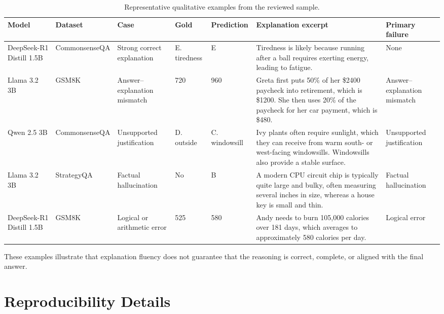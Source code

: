 \begin{table}[t]
\centering
\scriptsize
\caption{Representative qualitative examples from the reviewed sample.}
\label{tab:qualitative_examples}
\begin{tabular}{p{2.0cm}p{1.4cm}p{2.0cm}p{1.3cm}p{1.3cm}p{5.7cm}p{2.4cm}}
\toprule
\textbf{Model} &
\textbf{Dataset} &
\textbf{Case} &
\textbf{Gold} &
\textbf{Prediction} &
\textbf{Explanation excerpt} &
\textbf{Primary failure} \\
\midrule

DeepSeek-R1 Distill 1.5B &
CommonsenseQA &
Strong correct explanation &
E. tiredness &
E &
Tiredness is likely because running after a ball requires exerting energy,
leading to fatigue. &
None \\

Llama 3.2 3B &
GSM8K &
Answer--explanation mismatch &
720 &
960 &
Greta first puts 50\% of her \$2400 paycheck into retirement, which is
\$1200. She then uses 20\% of the paycheck for her car payment, which is
\$480. &
Answer--explanation mismatch \\

Qwen 2.5 3B &
CommonsenseQA &
Unsupported justification &
D. outside &
C. windowsill &
Ivy plants often require sunlight, which they can receive from warm
south- or west-facing windowsills. Windowsills also provide a stable
surface. &
Unsupported justification \\

Llama 3.2 3B &
StrategyQA &
Factual hallucination &
No &
B &
A modern CPU circuit chip is typically quite large and bulky, often
measuring several inches in size, whereas a house key is small and thin. &
Factual hallucination \\

DeepSeek-R1 Distill 1.5B &
GSM8K &
Logical or arithmetic error &
525 &
580 &
Andy needs to burn 105,000 calories over 181 days, which averages to
approximately 580 calories per day. &
Logical error \\
\bottomrule
\end{tabular}
\end{table}

These examples illustrate that explanation fluency does not guarantee that the
reasoning is correct, complete, or aligned with the final answer.

\section{Reproducibility Details}
\label{app:reproducibility}

